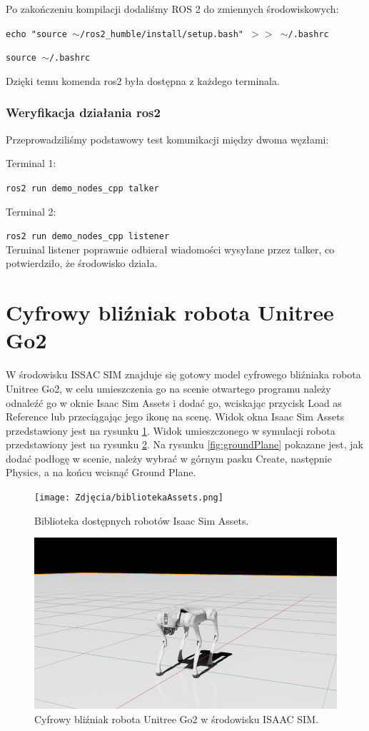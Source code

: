 \documentclass[12pt]{article}
\begin{document}
Po zakończeniu kompilacji dodaliśmy ROS 2 do zmiennych środowiskowych:

\texttt{echo "source $\sim$/ros2\_humble/install/setup.bash" $>>$ $\sim$/.bashrc}

\texttt{source $\sim$/.bashrc}

Dzięki temu komenda ros2 była dostępna z każdego terminala.

\subsubsection{Weryfikacja działania ros2 }

Przeprowadziliśmy podstawowy test komunikacji między dwoma węzłami:

Terminal 1:

\texttt{ros2 run demo\_nodes\_cpp talker}


Terminal 2:

\texttt{ros2 run demo\_nodes\_cpp listener}
\\
Terminal listener poprawnie odbierał wiadomości wysyłane przez talker, co potwierdziło, że środowisko działa.

\newpage
\section{Cyfrowy bliźniak robota Unitree Go2}

W środowisku ISSAC SIM znajduje się gotowy model cyfrowego bliźniaka robota Unitree Go2, w celu umieszczenia go na scenie otwartego programu należy odnaleźć go w oknie Isaac Sim Assets i dodać go, wciskając przycisk Load as Reference lub przeciągając jego ikonę na scenę. Widok okna Isaac Sim Assets przedstawiony jest na rysunku \ref{fig:Assets}. Widok umieszczonego w symulacji robota przedstawiony jest na rysunku \ref{fig:cyfrowyBlizniak}. Na rysunku \ref{fig:groundPlane} pokazane jest, jak dodać podłogę w scenie, należy wybrać w górnym pasku Create, następnie Physics,  a na końcu wcisnąć Ground Plane.  

\begin{figure}[h]
    \centering
    \texttt{[image: Zdjęcia/bibliotekaAssets.png]}
    \caption{Biblioteka dostępnych robotów Isaac Sim Assets.}
    \label{fig:Assets}
\end{figure}

\clearpage

\begin{figure}[h]
    \centering
    \includegraphics[width=0.7\linewidth]{Zdjęcia/cyfrowyBlizniakUnitryGo2.png}
    \caption{Cyfrowy bliźniak robota Unitree Go2 w środowisku ISAAC SIM.}
    \label{fig:cyfrowyBlizniak}
\end{figure}
\end{document}
